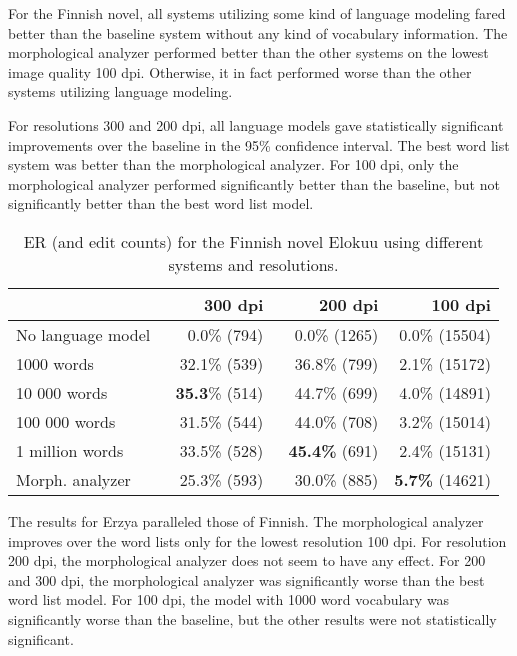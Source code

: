 \documentclass[b5paper]{article}
\begin{document}
For the Finnish novel, all systems utilizing some kind of language
modeling fared better than the baseline system without any kind of
vocabulary information. The morphological analyzer performed better
than the other systems on the lowest image quality 100 dpi. Otherwise,
it in fact performed worse than the other systems utilizing language
modeling.

For resolutions 300 and 200 dpi, all language models gave
statistically significant improvements over the baseline in the 95\%
confidence interval. The best word list system was better than the
morphological analyzer. For 100 dpi, only the morphological analyzer
performed significantly better than the baseline, but not
significantly better than the best word list model.

\begin{table}[!htb]
\begin{center}
\begin{tabular}{lrrr}
\hline 
                  & 300 dpi & 200 dpi & 100 dpi \\
\hline 
No language model & ~0.0\% (794)          & ~0.0\% (1265)          & 0.0\% (15504)  \\
1000 words        & ~32.1\% (539)  & ~36.8\% (799)        & 2.1\% (15172)           \\
10 000 words      & {\bf ~35.3}\% (514)  & ~44.7\%  (699)  & 4.0\% (14891)          \\
100 000 words     & ~31.5\% (544)   & ~44.0\%  (708)  & 3.2\%  (15014)              \\
1 million words   & ~33.5\% (528)   & {\bf ~45.4\%} (691)  & 2.4\% (15131)          \\
Morph. analyzer   & ~25.3\% (593)    & ~30.0\% (885)     & {\bf 5.7\%} (14621)      \\
\hline 
\end{tabular}
\caption{ER (and edit counts) for the Finnish novel Elokuu using different systems and resolutions.}\label{fin-novel-res}
\end{center}
\end{table}

The results for Erzya paralleled those of Finnish. The morphological
analyzer improves over the word lists only for the lowest resolution
100 dpi. For resolution 200 dpi, the morphological analyzer does not
seem to have any effect. For 200 and 300 dpi, the morphological
analyzer was significantly worse than the best word list model. For
100 dpi, the model with 1000 word vocabulary was significantly worse
than the baseline, but the other results were not statistically
significant.
\end{document}
